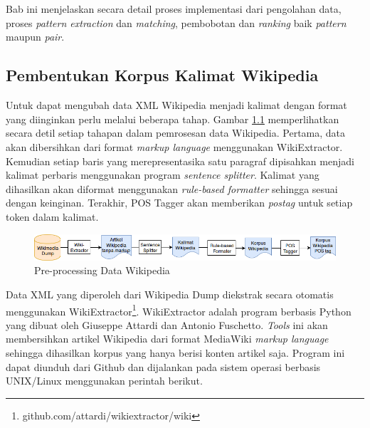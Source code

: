 \chapter{\babEmpat}
Bab ini menjelaskan secara detail proses implementasi dari pengolahan data, proses \textit{pattern extraction} dan \textit{matching}, pembobotan dan \textit{ranking} baik \textit{pattern} maupun \textit{pair}.

\section{Pembentukan Korpus Kalimat Wikipedia}
Untuk dapat mengubah data XML Wikipedia menjadi kalimat dengan format yang diinginkan perlu melalui beberapa tahap. Gambar \ref{fig:preproses-wiki} memperlihatkan secara detil setiap tahapan dalam pemrosesan data Wikipedia. Pertama, data akan dibersihkan dari format \textit{markup language} menggunakan WikiExtractor. Kemudian setiap baris yang merepresentasika satu paragraf dipisahkan menjadi kalimat perbaris menggunakan program \textit{sentence splitter}. Kalimat yang dihasilkan akan diformat menggunakan \textit{rule-based formatter} sehingga sesuai dengan keinginan. Terakhir, POS Tagger akan memberikan \textit{postag} untuk setiap token dalam kalimat.

\begin{figure}
    \centering
    \includegraphics[width=\linewidth]{pics/Pic02-PreProcessingWikipedia}
    \caption{Pre-processing Data Wikipedia}
    \label{fig:preproses-wiki}
\end{figure}

Data XML yang diperoleh dari Wikipedia Dump diekstrak secara otomatis menggunakan WikiExtractor\footnote{github.com/attardi/wikiextractor/wiki}. WikiExtractor adalah program berbasis Python yang dibuat oleh Giuseppe Attardi dan Antonio Fuschetto. \textit{Tools} ini akan membersihkan artikel Wikipedia dari format MediaWiki \textit{markup language} sehingga dihasilkan korpus yang hanya berisi konten artikel saja. Program ini dapat diunduh dari Github dan dijalankan pada sistem operasi berbasis UNIX/Linux menggunakan perintah berikut. 

